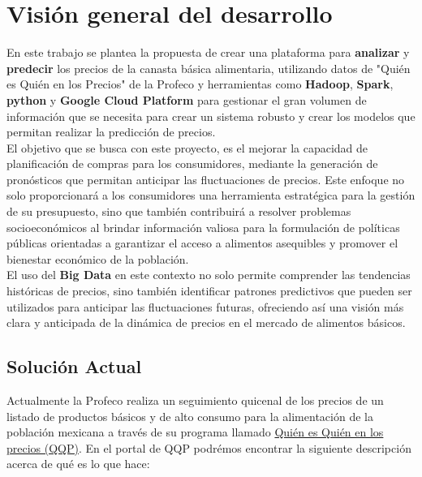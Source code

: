 \documentclass{article}
\begin{document}
\section{Visión general del desarrollo}

En este trabajo se plantea la propuesta de crear una plataforma para \textbf{analizar} y \textbf{predecir} los precios de la canasta básica alimentaria, utilizando datos de "Quién es Quién en los Precios" de la Profeco y herramientas como \textbf{Hadoop}, \textbf{Spark}, \textbf{python} y \textbf{Google Cloud Platform} para gestionar el gran volumen de información que se necesita para crear un sistema robusto y crear los modelos que permitan realizar la predicción de precios. \\

El objetivo que se busca con este proyecto, es el mejorar la capacidad de planificación de compras para los consumidores, mediante la generación de pronósticos que permitan anticipar las fluctuaciones de precios. Este enfoque no solo proporcionará a los consumidores una herramienta estratégica para la gestión de su presupuesto, sino que también contribuirá a resolver problemas socioeconómicos al brindar información valiosa para la formulación de políticas públicas orientadas a garantizar el acceso a alimentos asequibles y promover el bienestar económico de la población. \\

El uso del \textbf{Big Data} en este contexto no solo permite comprender las tendencias históricas de precios, sino también identificar patrones predictivos que pueden ser utilizados para anticipar las fluctuaciones futuras, ofreciendo así una visión más clara y anticipada de la dinámica de precios en el mercado de alimentos básicos.

\subsection{Solución Actual}
Actualmente la Profeco realiza un seguimiento quicenal de los precios de un listado de productos básicos y de alto consumo para la alimentación de la población mexicana a través de su programa llamado  \href{https://www.profeco.gob.mx/precios/canasta/qqpc.php}{Quién es Quién en los precios (QQP)}. En el portal de QQP podrémos encontrar la siguiente descripción acerca de qué es lo que hace:\\
\end{document}
